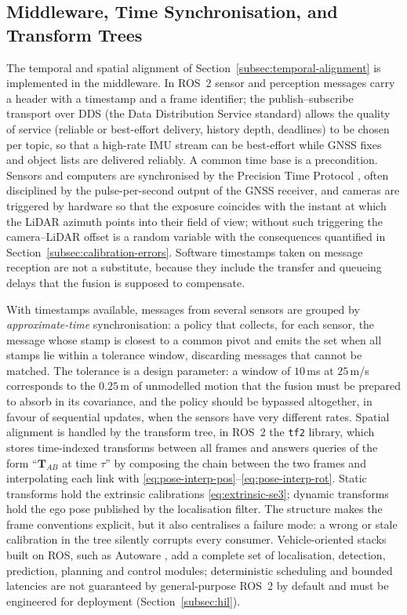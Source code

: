 \subsection{Middleware, Time Synchronisation, and Transform Trees}
\label{subsec:middleware}

The temporal and spatial alignment of Section~\ref{subsec:temporal-alignment} is implemented in the middleware. In ROS~2 \cite{macenski2022_ros2} sensor and perception messages carry a header with a timestamp and a frame identifier; the publish--subscribe transport over DDS (the Data Distribution Service standard) allows the quality of service (reliable or best-effort delivery, history depth, deadlines) to be chosen per topic, so that a high-rate IMU stream can be best-effort while GNSS fixes and object lists are delivered reliably. A common time base is a precondition. Sensors and computers are synchronised by the Precision Time Protocol \cite{ieee1588_2019}, often disciplined by the pulse-per-second output of the GNSS receiver, and cameras are triggered by hardware so that the exposure coincides with the instant at which the LiDAR azimuth points into their field of view; without such triggering the camera--LiDAR offset is a random variable with the consequences quantified in Section~\ref{subsec:calibration-errors}. Software timestamps taken on message reception are not a substitute, because they include the transfer and queueing delays that the fusion is supposed to compensate.

With timestamps available, messages from several sensors are grouped by \emph{approximate-time} synchronisation: a policy that collects, for each sensor, the message whose stamp is closest to a common pivot and emits the set when all stamps lie within a tolerance window, discarding messages that cannot be matched. The tolerance is a design parameter: a window of $10$\,ms at $25$\,m/s corresponds to the $0.25$\,m of unmodelled motion that the fusion must be prepared to absorb in its covariance, and the policy should be bypassed altogether, in favour of sequential updates, when the sensors have very different rates. Spatial alignment is handled by the transform tree, in ROS~2 the \texttt{tf2} library, which stores time-indexed transforms between all frames and answers queries of the form ``$\mathbf{T}_{AB}$ at time $\tau$'' by composing the chain between the two frames and interpolating each link with \eqref{eq:pose-interp-pos}--\eqref{eq:pose-interp-rot}. Static transforms hold the extrinsic calibrations \eqref{eq:extrinsic-se3}; dynamic transforms hold the ego pose published by the localisation filter. The structure makes the frame conventions explicit, but it also centralises a failure mode: a wrong or stale calibration in the tree silently corrupts every consumer. Vehicle-oriented stacks built on ROS, such as Autoware \cite{kato2018_autoware}, add a complete set of localisation, detection, prediction, planning and control modules; deterministic scheduling and bounded latencies are not guaranteed by general-purpose ROS~2 by default and must be engineered for deployment (Section~\ref{subsec:hil}).


